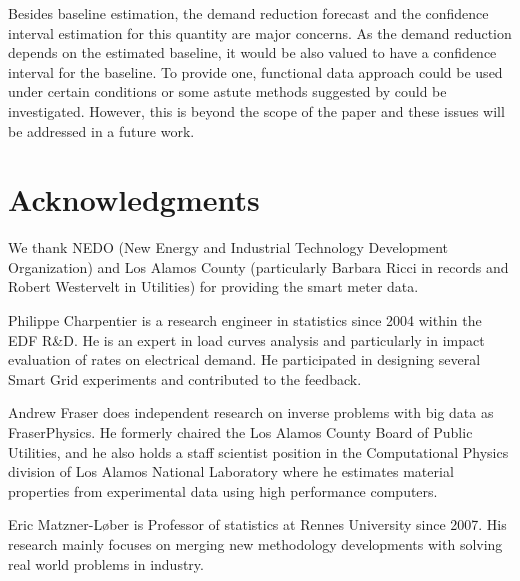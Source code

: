 \documentclass[journal]{IEEEtran}
\begin{document}
Besides baseline estimation, the demand reduction forecast and the
confidence interval estimation for this quantity are major
concerns. As the demand reduction depends on the estimated baseline,
it would be also valued to have a confidence interval for the
baseline. To provide one, functional data approach could be used under
certain conditions or some astute methods suggested by \cite{interval}
could be investigated. However, this is beyond the scope of the paper
and these issues will be addressed in a future work.

\section*{Acknowledgments}

We thank NEDO (New Energy and Industrial Technology Development
Organization) and Los Alamos County (particularly Barbara Ricci in
records and Robert Westervelt in Utilities) for providing the smart
meter data.





\begin{IEEEbiographynophoto}{Philippe Charpentier}
is a research engineer in statistics since 2004 within the EDF
R\&D. He is an expert in load curves analysis and particularly in
impact evaluation of rates on electrical demand. He participated in
designing several Smart Grid experiments and contributed to the
feedback.
\end{IEEEbiographynophoto}

\begin{IEEEbiographynophoto}{Andrew Fraser}
  does independent research on inverse problems with big data as
  FraserPhysics.  He formerly chaired the Los Alamos County Board of
  Public Utilities, and he also holds a staff scientist position in
  the Computational Physics division of Los Alamos National Laboratory
  where he estimates material properties from experimental data using
  high performance computers.
\end{IEEEbiographynophoto}

\begin{IEEEbiographynophoto}{Eric Matzner-L{\o}ber}
is Professor of statistics at Rennes University since 2007. His
research mainly focuses on merging new methodology developments with
solving real world problems in industry.
\end{IEEEbiographynophoto}
\end{document}
